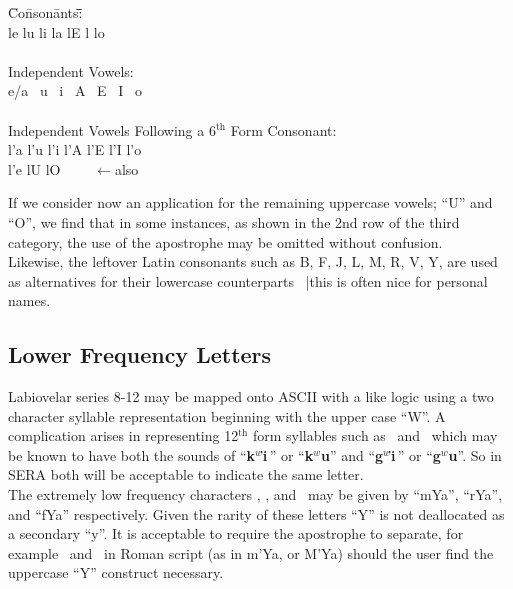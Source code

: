 \begin{tabbing}
\hspace{0.2in}\=Co\=nson\=ants\=:\hspace{0.2in}\= \hspace{0.25in}\= \hspace{0.3in}\=  \hspace{0.25in}\= \\
    \>\>le   \>lu   \>li   \>la   \>lE   \>l    \>lo \\
 \ \\ 
    \>Independent Vowels: \\
    \>\>e/a  \>\ u    \>\ i    \>\ A    \>\ E    \>\ I    \>\ o \\
 \ \\ 
    \>Independent Vowels Following a 6$^{\textrm{th}}$ Form Consonant: \\
    \>\>l'a \>l'u \>l'i \>l'A \>l'E \>l'I \>l'o \\
    \>\>l'e \>lU  \>    \>    \>    \>    \>lO \ \ \ \ $\leftarrow$also \\
\end{tabbing}
\noi 
 If we consider now an application for the remaining uppercase vowels; ``U''
 and ``O'', we find that in some instances, as shown in the 2nd row of the 
 third category, the use of the apostrophe may be omitted without confusion. \\
 
 Likewise, the leftover Latin consonants such as B, F, J, L, M, R, V, Y, are 
 used as alternatives for their lowercase counterparts \ |this is often nice for 
 personal names. 

\subsection{Lower Frequency Letters}
 Labiovelar series 8-12 may be mapped onto ASCII with a like logic using a
 two character syllable representation beginning with the upper case ``W''.
 A complication arises in representing 12$^{\textrm{th}}$ form syllables such 
 as \kWu \ and \gWu \ which may be known to have both the 
 sounds of ``{\bf k$^w${\"\i}}\,'' or ``{\bf k$^w$u}'' and
           ``{\bf g$^w${\"\i}}\,'' or ``{\bf g$^w$u}''.
 So in SERA both will be acceptable to indicate the same letter.  \\

 The extremely low frequency characters \mYa, \rYa, and \fYa \ may be given
 by ``mYa'', ``rYa'', and ``fYa'' respectively.  Given the rarity of these
 letters ``Y'' is not deallocated as a secondary ``y''.  It is
 acceptable to require the apostrophe to separate, for example \m \ and \ya \ 
 in Roman script (as in m'Ya, or M'Ya) should the user find the uppercase
 ``Y'' construct necessary.

